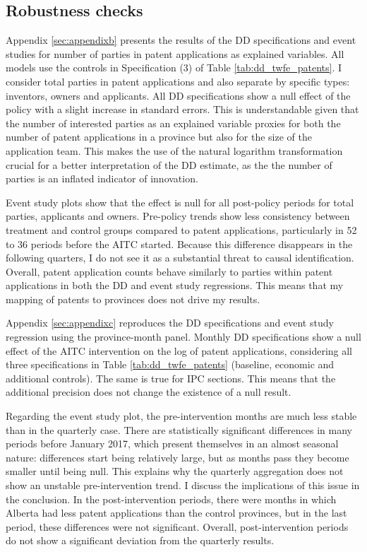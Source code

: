 \documentclass[../main.tex]{subfiles}
\begin{document}
\subsection{Robustness checks}

Appendix \ref{sec:appendixb} presents the results of the DD specifications and event studies for number of parties in patent applications as explained variables. All models use the controls in Specification (3) of Table \ref{tab:dd_twfe_patents}. I consider total parties in patent applications and also separate by specific types: inventors, owners and applicants. All DD specifications show a null effect of the policy with a slight increase in standard errors. This is understandable given that the number of interested parties as an explained variable proxies for both the number of patent applications in a province but also for the size of the application team. This makes the use of the natural logarithm transformation crucial for a better interpretation of the DD estimate, as the the number of parties is an inflated indicator of innovation. 

Event study plots show that the effect is null for all post-policy periods for total parties, applicants and owners. Pre-policy trends show less consistency between treatment and control groups compared to patent applications, particularly in 52 to 36 periods before the AITC started. Because this difference disappears in the following quarters, I do not see it as a substantial threat to causal identification. Overall, patent application counts behave similarly to parties within patent applications in both the DD and event study regressions. This means that my mapping of patents to provinces does not drive my results.

Appendix \ref{sec:appendixc} reproduces the DD specifications and event study regression using the province-month panel. Monthly DD specifications show a null effect of the AITC intervention on the log of patent applications, considering all three specifications in Table \ref{tab:dd_twfe_patents} (baseline, economic and additional controls). The same is true for IPC sections. This means that the additional precision does not change the existence of a null result. 

Regarding the event study plot, the pre-intervention months are much less stable than in the quarterly case. There are statistically significant differences in many periods before January 2017, which present themselves in an almost seasonal nature: differences start being relatively large, but as months pass they become smaller until being null. This explains why the quarterly aggregation does not show an unstable pre-intervention trend. I discuss the implications of this issue in the conclusion. In the post-intervention periods, there were months in which Alberta had less patent applications than the control provinces, but in the last period, these differences were not significant. Overall, post-intervention periods do not show a significant deviation from the quarterly results.
\end{document}
